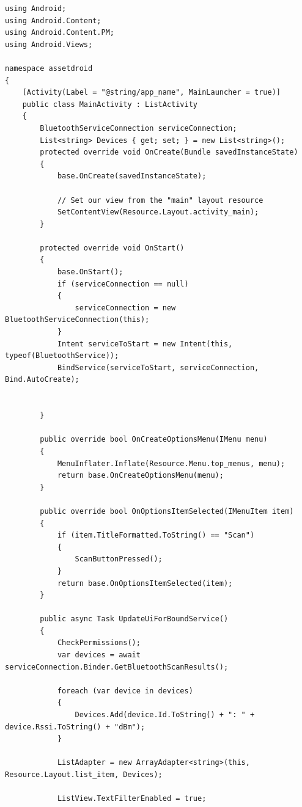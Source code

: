 \begin{lstlisting}
using Android;
using Android.Content;
using Android.Content.PM;
using Android.Views;

namespace assetdroid
{
    [Activity(Label = "@string/app_name", MainLauncher = true)]
    public class MainActivity : ListActivity
    {
        BluetoothServiceConnection serviceConnection;
        List<string> Devices { get; set; } = new List<string>();
        protected override void OnCreate(Bundle savedInstanceState)
        {
            base.OnCreate(savedInstanceState);
            
            // Set our view from the "main" layout resource
            SetContentView(Resource.Layout.activity_main);
        }
        
        protected override void OnStart()
        {
            base.OnStart();
            if (serviceConnection == null)
            {
                serviceConnection = new BluetoothServiceConnection(this);
            }
            Intent serviceToStart = new Intent(this, typeof(BluetoothService));
            BindService(serviceToStart, serviceConnection, Bind.AutoCreate);
            
            
        }
        
        public override bool OnCreateOptionsMenu(IMenu menu)
        {
            MenuInflater.Inflate(Resource.Menu.top_menus, menu);
            return base.OnCreateOptionsMenu(menu);
        }
        
        public override bool OnOptionsItemSelected(IMenuItem item)
        {
            if (item.TitleFormatted.ToString() == "Scan")
            {
                ScanButtonPressed();
            }
            return base.OnOptionsItemSelected(item);
        }
        
        public async Task UpdateUiForBoundService()
        {
            CheckPermissions();
            var devices = await serviceConnection.Binder.GetBluetoothScanResults();
            
            foreach (var device in devices)
            {
                Devices.Add(device.Id.ToString() + ": " + device.Rssi.ToString() + "dBm");
            }
            
            ListAdapter = new ArrayAdapter<string>(this, Resource.Layout.list_item, Devices);
            
            ListView.TextFilterEnabled = true;
            

\end{lstlisting}
